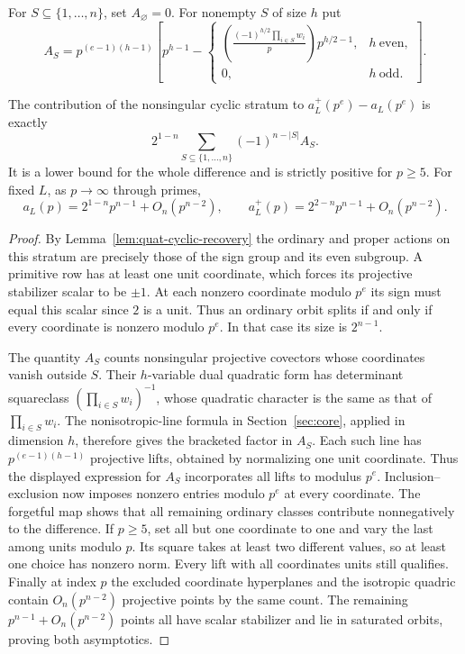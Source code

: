 For $S\subseteq\{1,\ldots,n\}$, set $A_\varnothing=0$. For nonempty $S$ of size $h$ put
\[
 A_S=p^{(e-1)(h-1)}
 \left[p^{h-1}-
 \begin{cases}
 \displaystyle\left(\frac{(-1)^{h/2}\prod_{i\in S} w_i}{p}\right)p^{h/2-1},& h\ \mathrm{even},\\
 0,&h\ \mathrm{odd}.
 \end{cases}\right].
\]
\begin{theorem}\label{thm:even-good-gap}
The contribution of the nonsingular cyclic stratum to $a_L^+(p^e)-a_L(p^e)$ is exactly
\[
 2^{1-n}\sum_{S\subseteq\{1,\ldots,n\}}(-1)^{n-|S|} A_S.
\]
It is a lower bound for the whole difference and is strictly positive for $p\ge5$. For fixed $L$, as $p\to\infty$ through primes,
\[
 a_L(p)=2^{1-n}p^{n-1}+O_n(p^{n-2}),\qquad
 a_L^+(p)=2^{2-n}p^{n-1}+O_n(p^{n-2}).
\]
\end{theorem}
\begin{proof}
By Lemma~\ref{lem:quat-cyclic-recovery} the ordinary and proper actions on this stratum are precisely those of the sign group and its even subgroup. A primitive row has at least one unit coordinate, which forces its projective stabilizer scalar to be $\pm1$. At each nonzero coordinate modulo $p^e$ its sign must equal this scalar since $2$ is a unit. Thus an ordinary orbit splits if and only if every coordinate is nonzero modulo $p^e$. In that case its size is $2^{n-1}$.

The quantity $A_S$ counts nonsingular projective covectors whose
coordinates vanish outside $S$. Their $h$-variable dual quadratic form
has determinant squareclass $(\prod_{i\in S}w_i)^{-1}$, whose
quadratic character is the same as that of $\prod_{i\in S}w_i$.
The nonisotropic-line formula in Section~\ref{sec:core}, applied in
dimension $h$, therefore gives the bracketed factor in $A_S$.
Each such line has $p^{(e-1)(h-1)}$ projective lifts, obtained by
normalizing one unit coordinate. Thus the displayed expression for
$A_S$ incorporates all lifts to modulus $p^e$. Inclusion--exclusion now imposes nonzero entries modulo $p^e$ at every coordinate. The forgetful map shows that all remaining ordinary classes
contribute nonnegatively to the difference. If $p\ge5$, set all but one coordinate to one and vary the last among units modulo $p$. Its square takes at least two different values, so at least one choice has nonzero norm. Every lift with all coordinates units still qualifies. Finally at index $p$ the excluded coordinate hyperplanes and the isotropic quadric contain $O_n(p^{n-2})$ projective points by the same count. The remaining $p^{n-1}+O_n(p^{n-2})$ points all have scalar stabilizer and lie in saturated orbits, proving both asymptotics.
\end{proof}

